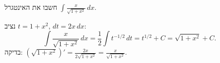 
\begin{question}
חשבו את האינטגרל $\displaystyle\int\frac{x}{\sqrt{1+x^2}}\,dx$.
\end{question}

\begin{solution}
נציב $t=1+x^2$, $dt=2x\,dx$:
\[ \int\frac{x}{\sqrt{1+x^2}}\,dx=\frac12\int t^{-1/2}\,dt=t^{1/2}+C=\sqrt{1+x^2}+C. \]
בדיקה: $\left(\sqrt{1+x^2}\right)'=\frac{2x}{2\sqrt{1+x^2}}=\frac{x}{\sqrt{1+x^2}}$.
\end{solution}
